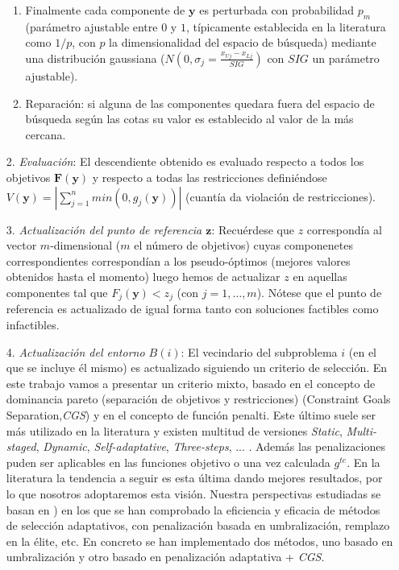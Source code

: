 \begin{enumerate}
\begin{enumerate}
        \item Finalmente cada componente de $\boldsymbol{y}$ es perturbada con probabilidad $p_m$ (parámetro ajustable entre $0$ y $1$, típicamente establecida en la literatura como $1/p$, con $p$ la dimensionalidad del espacio de búsqueda) mediante una distribución gaussiana ($N(0,\sigma_{j} = \frac{x_{Uj} - x_{Lj}}{SIG})$ con $SIG$ un parámetro ajustable).\\
        
        \item Reparación: si alguna de las componentes quedara fuera del espacio de búsqueda según las cotas su valor es establecido al valor de la más cercana.\\
    \end{enumerate}

    \item[2.] \textit{Evaluación}: El descendiente obtenido es evaluado respecto a todos los objetivos $\boldsymbol{F}(\boldsymbol{y})$ y respecto a todas las restricciones definiéndose $V(\boldsymbol{y}) = \left\vert \sum \limits_{j=1}^{n} min(0, g_j(\boldsymbol{y})) \right\vert$ (cuantía da violación de restricciones).\\
    
    \item[3.] \textit{Actualización del punto de referencia $\boldsymbol{z}$}: Recuérdese que $z$ correspondía al vector $m$-dimensional ($m$ el número de objetivos) cuyas componenetes correspondientes correspondían a los pseudo-óptimos (mejores valores obtenidos hasta el momento) luego hemos de actualizar $z$ en aquellas componentes tal que $F_j(\boldsymbol{y}) < z_j$ (con $j=1,\dots,m$). Nótese que el punto de referencia es actualizado de igual forma tanto con soluciones factibles como infactibles.\\
    
    \item[4.] \textit{Actualización del entorno $B(i)$}: El vecindario del subproblema $i$ (en el que se incluye él mismo) es actualizado siguiendo un criterio de selección. En este trabajo vamos a presentar un criterio mixto, basado en el concepto de dominancia pareto (separación de objetivos y restricciones)  (Constraint Goals Separation,\textit{CGS}) y en el concepto de función penalti. Este último suele ser más utilizado en la literatura y existen multitud de versiones \textit{Static}, \textit{Multi-staged}, \textit{Dynamic}, \textit{Self-adaptative}, \textit{Three-steps}, ... \cite{Vaz}. Además las penalizaciones puden ser aplicables en las funciones objetivo o una vez calculada $g^{te}$. En la literatura la tendencia a seguir es esta última dando mejores resultados, por lo que nosotros adoptaremos esta visión. Nuestra perspectivas estudiadas se basan en \cite{Fan2017,Asafuddoula2012,Yang2020,Jan2010,Zhu2019}) en los que se han comprobado la eficiencia y eficacia de métodos de selección adaptativos, con penalización basada en umbralización, remplazo en la élite, etc. En concreto se han implementado dos métodos, uno basado en umbralización y otro basado en penalización adaptativa + \textit{CGS}.\\
    

\end{enumerate}
